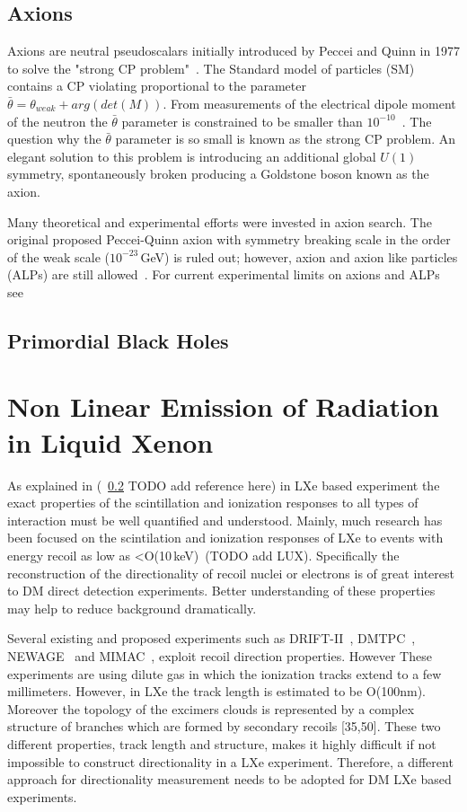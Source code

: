 \subsection{Axions}

Axions are neutral pseudoscalars initially introduced by Peccei and Quinn in 1977 to solve the "strong CP problem"~\cite{Peccei:1977hh}. The Standard model of particles (SM) contains a CP violating proportional to the parameter $\bar{\theta} = \theta_{weak}+ arg(det(M))$. From measurements  of the electrical dipole moment of the neutron the $\bar{\theta}$ parameter is constrained to be smaller than $10^{-10}$~\cite{Pospelov:2005pr,Baker:2006ts}. The question why the $\bar{\theta}$ parameter is so small is known as the strong CP problem. An elegant solution to this problem is introducing an additional global $U(1)$ symmetry, spontaneously broken producing a Goldstone boson known as the axion. 

Many theoretical and experimental efforts were invested in axion search. The original proposed Peccei-Quinn axion with symmetry breaking scale in the order of the weak scale ($10^{-23}$\,GeV) is ruled out; however, axion and axion like particles (ALPs) are still allowed~\cite{Kim:1979if}. For current experimental limits on axions and ALPs see~\cite{Akerib:2017uem} 

\subsection{Primordial Black Holes}

\section{Non Linear Emission of Radiation in Liquid Xenon}
\label{sec:intro_superradiance}
As explained in (~\ref{} TODO add reference here) in LXe based experiment the exact properties of the scintillation and ionization responses to all types of interaction must be well quantified and understood. Mainly, much research has been focused on the scintilation and ionization responses of LXe to events with energy recoil as low as <O(10\,keV)~\cite{Manzur:2009hp,Aprile:2012an,Baudis:2013cca}(TODO add LUX).
Specifically the reconstruction of the directionality of recoil nuclei or electrons is of great interest to DM direct detection experiments. Better understanding of these properties may help to reduce background dramatically.

Several existing and proposed experiments such as DRIFT-II~\cite{Muna:2007zz}, DMTPC~\cite{Deaconu:2017vam}, NEWAGE~\cite{Yakabe:2016pjh} and MIMAC~\cite{Riffard:2016mgw}, exploit recoil direction properties. However These experiments are using dilute gas in which the ionization tracks extend to a few millimeters. However, in LXe the track length is estimated to be O(100nm). Moreover the topology of the excimers clouds is represented by a complex structure of branches which are formed by secondary recoils [35,50]. These two different properties, track length and structure, makes it highly difficult if not impossible to construct directionality in a LXe experiment. Therefore, a different approach for directionality measurement needs to be adopted for DM LXe based experiments.


